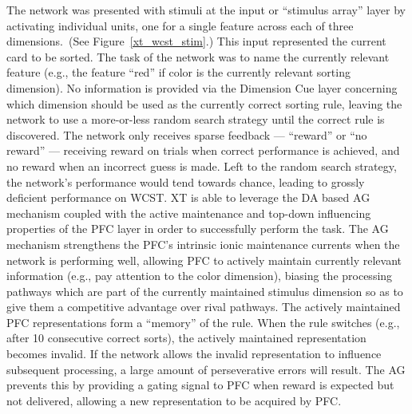 \documentclass[man]{apa}
\begin{document}
The network was presented with stimuli at the input or ``stimulus array'' layer by activating individual units, one for a single feature across each of three dimensions.~(See Figure~\ref{xt_wcst_stim}.)  This input represented the current card to be sorted.  The task of the network was to name the currently relevant feature (e.g., the feature ``red'' if color is the currently relevant sorting dimension).  No information is provided via the Dimension Cue layer concerning which dimension should be used as the currently correct sorting rule, leaving the network to use a more-or-less random search strategy until the correct rule is discovered.  The network only receives sparse feedback --- ``reward'' or ``no reward'' --- receiving reward on trials when correct performance is achieved, and no reward when an incorrect guess is made.  Left to the random search strategy, the network's performance would tend towards chance, leading to grossly deficient performance on WCST.  XT is able to leverage the DA based AG mechanism coupled with the active maintenance and top-down influencing properties of the PFC layer in order to successfully perform the task.  The AG mechanism strengthens the PFC's intrinsic ionic maintenance currents when the network is performing well, allowing PFC to actively maintain currently relevant information (e.g., pay attention to the color dimension), biasing the processing pathways which are part of the currently maintained stimulus dimension so as to give them a competitive advantage over rival pathways.  The actively maintained PFC representations form a ``memory'' of the rule.  When the rule switches (e.g., after 10 consecutive correct sorts), the actively maintained representation becomes invalid.  If the network allows the invalid representation to influence subsequent processing, a large amount of perseverative errors will result.  The AG prevents this by providing a gating signal to PFC when reward is expected but not delivered, allowing a new representation to be acquired by PFC.



%
%
%

\end{document}
